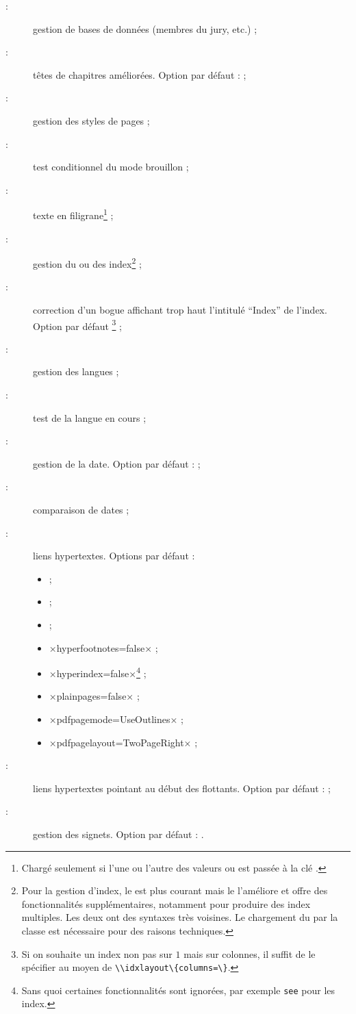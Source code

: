 \begin{description}
\item[ :] gestion de bases de données (membres du
  jury, etc.) ;
\item[ :] têtes de chapitres améliorées. Option par défaut :
   ;
\item[ :] gestion des styles de pages ;
\item[ :] test conditionnel du mode brouillon ;
\item[ :] texte en filigrane\footnote{Chargé seulement
    si l'une ou l'autre des valeurs  ou 
    est passée à la clé .} ;
\item[ :] gestion du ou des index\footnote{Pour la gestion
    d'index, le  est plus courant mais le 
    l'améliore et offre des fonctionnalités supplémentaires, notamment pour
    produire des index multiples. Les deux ont des syntaxes très voisines. Le
    chargement du  par la classe est nécessaire pour des raisons
    techniques.} ;
\item[ :] correction d'un bogue affichant trop haut
  l'intitulé \enquote{Index} de l'index. Option par défaut
  \footnote{Si on souhaite un index non pas sur $1$ mais
    sur  colonnes, il suffit de le spécifier au moyen de
    \protect\lstinline+\\idxlayout\{columns=+\protect\lstinline+\}+.} ;
\item[ :] gestion des langues ;
\item[ :] test de la langue en cours ;
\item[ :] gestion de la date. Option par défaut :
   ;
\item[ :] comparaison de dates ;
\item[ :] liens hypertextes. Options par défaut :
  \begin{itemize}
  \item {} ;
  \item {} ;
  \item {} ;
  \item ×hyperfootnotes=false× ;
  \item ×hyperindex=false×\footnote{Sans quoi certaines fonctionnalités sont
      ignorées, par exemple \protect\lstinline|see| pour les index.} ;
  \item ×plainpages=false× ;
  \item ×pdfpagemode=UseOutlines× ;
  \item ×pdfpagelayout=TwoPageRight× ;
  \end{itemize}
\item[ :] liens hypertextes pointant au début des
  flottants\ifscreenoutput. Option par défaut :  ;
\item[ :] gestion des signets\ifscreenoutput. Option par
  défaut : .
\end{description}

